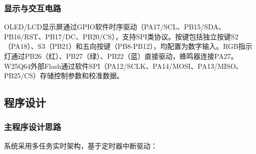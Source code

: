 \documentclass[12pt,a4paper]{ctexart}
\begin{document}
\subsubsection{显示与交互电路}

OLED/LCD显示屏通过GPIO软件时序驱动（PA17/SCL、PB15/SDA、PB16/RST、PB17/DC、PB20/CS），支持SPI类协议。按键包括独立按键S2（PA18）、S3（PB21）和五向按键（PB8-PB12），均配置为数字输入。RGB指示灯通过PB26（红）、PB27（绿）、PB22（蓝）直接驱动，蜂鸣器连接PA27。W25Q64外部Flash通过软件SPI（PA12/SCLK、PA14/MOSI、PA13/MISO、PB25/CS）存储控制参数和校准数据。

\subsection{程序设计}

\subsubsection{主程序设计思路}

系统采用多任务实时架构，基于定时器中断驱动：
\end{document}
